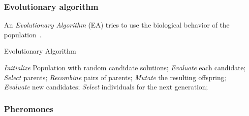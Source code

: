 \subsubsection{Evolutionary algorithm} 
An \textit{Evolutionary Algorithm} (EA) tries to use the biological behavior of the population~\cite{evo}. 


\begin{algorithm}
\caption{Evolutionary Algorithm~\cite{evo}}
\label{alg:evo}
\begin{algorithmic}
\State \emph{Initialize} Population with random candidate solutions;
\State \emph{Evaluate} each candidate;
\State \emph{Select} parents;
\State \emph{Recombine} pairs of parents;
\State \emph{Mutate} the resulting offspring;
\State \emph{Evaluate} new candidates;
\State \emph{Select} individuals for the next generation;
\EndWhile
\end{algorithmic}
\end{algorithm}




\subsubsection{Pheromones} 



